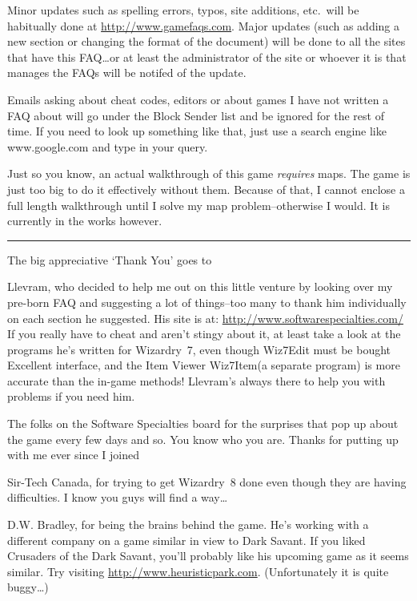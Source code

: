 \documentclass[12pt]{article}
\begin{document}
Minor updates such as spelling errors, typos, site additions, etc.\ will
be habitually done at \url{http://www.gamefaqs.com}. Major updates (such
as adding a new section or changing the format of the document) will be
done to all the sites that have this FAQ\ldots{}or at least the
administrator of the site or whoever it is that manages the FAQs will be
notifed of the update.

Emails asking about cheat codes, editors or about games I have not
written a FAQ about will go under the Block Sender list and be ignored
for the rest of time. If you need to look up something like that, just
use a search engine like www.google.com and type in your query.

Just so you know, an actual walkthrough of this game \emph{requires}
maps. The game is just too big to do it effectively without them.
Because of that, I cannot enclose a full length walkthrough until I
solve my map problem--otherwise I would. It is currently in the works
however.

\begin{center}\rule{0.5\linewidth}{\linethickness}\end{center}

The big appreciative `Thank You' goes to

Llevram, who decided to help me out on this little venture by looking
over my pre-born FAQ and suggesting a lot of things--too many to thank
him individually on each section he suggested. His site is at:
\url{http://www.softwarespecialties.com/} If you really have to cheat
and aren't stingy about it, at least take a look at the programs he's
written for Wizardry~7, even though Wiz7Edit must be bought Excellent
interface, and the Item Viewer Wiz7Item(a separate program) is more
accurate than the in-game methods! Llevram's always there to help you
with problems if you need him.

The folks on the Software Specialties board for the surprises that pop
up about the game every few days and so. You know who you are. Thanks
for putting up with me ever since I joined

Sir-Tech Canada, for trying to get Wizardry~8 done even though they are
having difficulties. I know you guys will find a way\ldots{}

D.W. Bradley, for being the brains behind the game. He's working with a
different company on a game similar in view to Dark Savant. If you liked
Crusaders of the Dark Savant, you'll probably like his upcoming game as
it seems similar. Try visiting \url{http://www.heuristicpark.com}.
(Unfortunately it is quite buggy\ldots{})
\end{document}
